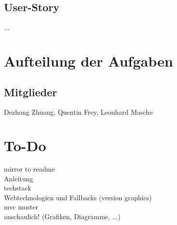\documentclass[a4paper]{article}
\begin{document}
\subsection{User-Story}

...




\section{Aufteilung der Aufgaben}

\subsection*{Mitglieder}
Dezhong Zhuang, Quentin Frey, Leonhard Masche

\section{To-Do}
mirror to readme\\
Anleitung\\
techstack\\
Webtechnologien und Fallbacks (version graphics)\\
mvc muster\\
anschaulich! (Grafiken, Diagramme, ...)
\end{document}
